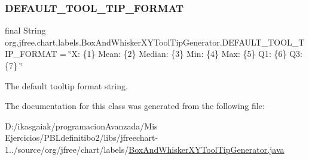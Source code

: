 \subsubsection{\texorpdfstring{D\+E\+F\+A\+U\+L\+T\+\_\+\+T\+O\+O\+L\+\_\+\+T\+I\+P\+\_\+\+F\+O\+R\+M\+AT}{DEFAULT\_TOOL\_TIP\_FORMAT}}
{\footnotesize\ttfamily final String org.\+jfree.\+chart.\+labels.\+Box\+And\+Whisker\+X\+Y\+Tool\+Tip\+Generator.\+D\+E\+F\+A\+U\+L\+T\+\_\+\+T\+O\+O\+L\+\_\+\+T\+I\+P\+\_\+\+F\+O\+R\+M\+AT = \char`\"{}X\+: \{1\} Mean\+: \{2\} Median\+: \{3\} Min\+: \{4\} Max\+: \{5\} Q1\+: \{6\} Q3\+: \{7\} \char`\"{}\hspace{0.3cm}{\ttfamily [static]}}

The default tooltip format string. 

The documentation for this class was generated from the following file\+:\begin{DoxyCompactItemize}
\item 
D\+:/ikasgaiak/programacion\+Avanzada/\+Mis Ejercicios/\+P\+B\+Ldefinitibo2/libs/jfreechart-\/1../source/org/jfree/chart/labels/\mbox{\hyperlink{_box_and_whisker_x_y_tool_tip_generator_8java}{Box\+And\+Whisker\+X\+Y\+Tool\+Tip\+Generator.\+java}}\end{DoxyCompactItemize}
